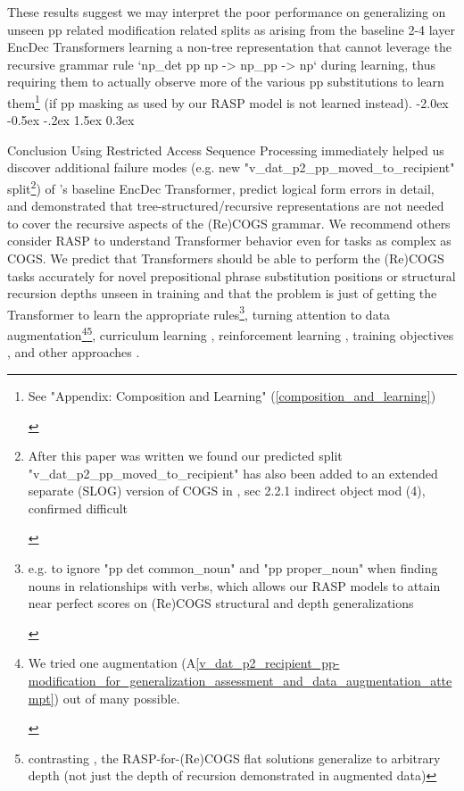 \documentclass[11pt]{article}
\makeatletter
\renewcommand\section{\@startsection{section}{1}{\z@}%
                                  {-2.0ex \@plus -0.5ex \@minus -.2ex}%
                                  {1.5ex \@plus 0.3ex}%
                                  {\large\bfseries\raggedright}}
\makeatother
\begin{document}
These results suggest we may interpret the poor performance on generalizing on unseen pp related modification related splits as arising from the baseline 2-4 layer EncDec Transformers learning a non-tree representation that cannot leverage the recursive grammar rule `np\_det pp np -> np\_pp -> np` during learning, thus requiring them to actually observe more of the various pp substitutions to learn them\footnote{\begin{footnotesize}See "Appendix: Composition and Learning" (\ref{composition_and_learning})\end{footnotesize}} (if pp masking as used by our RASP model is not learned instead). \section{Conclusion} Using Restricted Access Sequence Processing immediately helped us discover additional failure modes (e.g. new "v\_dat\_p2\_pp\_moved\_to\_recipient" split\footnote{\begin{footnotesize}After this paper was written we found our predicted split "v\_dat\_p2\_pp\_moved\_to\_recipient" has also been added to an extended separate (SLOG) version of COGS in \citep{li2023slogstructuralgeneralizationbenchmark}, sec 2.2.1 indirect object mod (4), confirmed difficult
\end{footnotesize}
}) of \citep{Wu2023}'s baseline EncDec Transformer, predict logical form errors in detail, and demonstrated that tree-structured/recursive representations are not needed to cover the recursive aspects of the (Re)COGS grammar. We recommend others consider RASP to understand Transformer behavior even for tasks as complex as COGS. We predict that Transformers should be able to perform the (Re)COGS tasks accurately for novel prepositional phrase substitution positions or structural recursion depths unseen in training and that the problem is just of getting the Transformer to learn the appropriate rules\footnote{\begin{footnotesize}e.g. to ignore "pp det common\_noun" and "pp proper\_noun" when finding nouns in relationships with verbs, which allows our RASP models to attain near perfect scores on (Re)COGS structural and depth generalizations\end{footnotesize}}, turning attention to data augmentation\footnote{\begin{footnotesize}We tried one augmentation (A\ref{v_dat_p2_recipient_pp-modification_for_generalization_assessment_and_data_augmentation_attempt}) out of many possible.
\end{footnotesize}}\citep{qiu-etal-2022-improving}\footnote{contrasting \citep{qiu-etal-2022-improving}, the RASP-for-(Re)COGS flat solutions generalize to arbitrary depth (not just the depth of recursion demonstrated in augmented data)}, curriculum learning \citep{10.1145/1553374.1553380}, reinforcement learning \citep{Ranzato2015}, training objectives \citep{10.1162/tacl_a_00733}, and other approaches \citep{Csordas2021} \citep{ontanon-etal-2022-making}.
\end{document}
